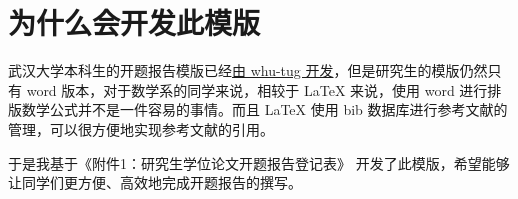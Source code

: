 
\section{为什么会开发此模版}

武汉大学本科生的开题报告模版已经\href{https://github.com/whutug/whu-thesis}{由 whu-tug 开发}，但是研究生的模版仍然只有 word 版本，对于数学系的同学来说，相较于 \LaTeX{} 来说，使用 word 进行排版数学公式并不是一件容易的事情。而且 \LaTeX{} 使用 bib 数据库进行参考文献的管理，可以很方便地实现参考文献的引用。

于是我基于《附件1：研究生学位论文开题报告登记表》\cite{研究生学位论文开题报告登记表} 开发了此模版，希望能够让同学们更方便、高效地完成开题报告的撰写。
